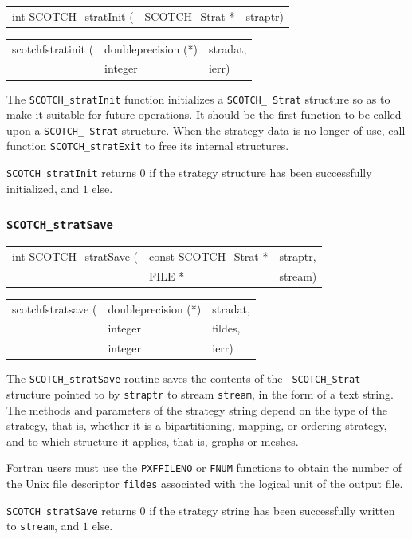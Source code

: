 \begin{itemize}
\progsyn

{\tt\begin{tabular}{l@{}ll}
int SCOTCH\_stratInit ( & SCOTCH\_Strat * & straptr)
\end{tabular}}

{\tt\begin{tabular}{l@{}ll}
scotchfstratinit ( & doubleprecision (*) & stradat, \\
                   & integer             & ierr)
\end{tabular}}

\progdes

The {\tt SCOTCH\_stratInit} function initializes a {\tt SCOTCH\_\lbt
Strat} structure so as to make it suitable for future operations. It
should be the first function to be called upon a {\tt SCOTCH\_\lbt
Strat} structure. When the strategy data is no longer of use, call
function {\tt SCOTCH\_\lbt strat\lbt Exit} to free its internal
structures.

\progret

{\tt SCOTCH\_stratInit} returns $0$ if the strategy structure has been
successfully initialized, and $1$ else.
\end{itemize}

\subsubsection{{\tt SCOTCH\_stratSave}}

\begin{itemize}
\progsyn

{\tt\begin{tabular}{l@{}ll}
int SCOTCH\_stratSave ( & const SCOTCH\_Strat * & straptr, \\
                        & FILE *                & stream)
\end{tabular}}

{\tt\begin{tabular}{l@{}ll}
scotchfstratsave ( & doubleprecision (*) & stradat, \\
                   & integer             & fildes,  \\
                   & integer             & ierr)
\end{tabular}}

\progdes

The {\tt SCOTCH\_stratSave} routine saves the contents of the {\tt
SCOTCH\_\lbt Strat} structure pointed to by {\tt straptr} to stream
{\tt stream}, in the form of a text string. The methods and
parameters of the strategy string depend on the type of the strategy,
that is, whether it is a bipartitioning, mapping, or ordering
strategy, and to which structure it applies, that is, graphs or
meshes.

Fortran users must use the {\tt PXFFILENO} or {\tt FNUM} functions to
obtain the number of the Unix file descriptor {\tt fildes} associated
with the logical unit of the output file.

\progret

{\tt SCOTCH\_stratSave} returns $0$ if the strategy string has been
successfully written to {\tt stream}, and $1$ else.
\end{itemize}

